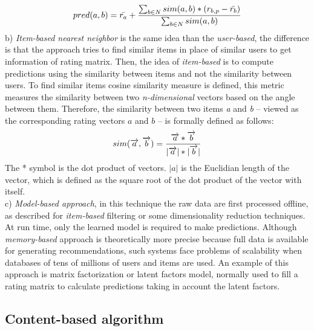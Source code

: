 \begin{equation}\label{eq:prediction}
\displaystyle pred(a,b) = \bar{r_a} + 
{\sum_{b \in N} sim(a,b) * (r_{b,p}- \bar{r_b}) 
\over \sum_{b \in N} sim(a,b)} 
\end{equation}
b) \textit{Item-based nearest neighbor} is the same idea than the \textit
{user-based}, the difference is that the approach tries to find
similar items in place of similar users to get information of rating
matrix.  Then, the idea of \textit{item-based} is to compute
predictions using the similarity between items and not the similarity
between users.  To find similar items cosine similarity measure is
defined, this metric measures the similarity between two
\textit{n-dimensional} vectors based on the angle between them.
Therefore, the similarity between two items \textit{a} and \textit{b}
– viewed as the corresponding rating vectors $a$ and $b$ – is formally
defined as follows:
\begin{equation}\label{eq:cosine}
\displaystyle sim(\overrightarrow{a},\overrightarrow{b})= 
{\overrightarrow{a}* \overrightarrow{b} \over
|\overrightarrow{a}|*|\overrightarrow{b}| }
\end{equation}
The * symbol is the dot product of vectors. $|a|$ is the Euclidian
length of the vector, which is defined as the square root of the dot
product of the vector with itself.\\ 
c) \textit{Model-based approach}, in this technique  the raw data are
first processed offline, as described for \textit {item-based}
filtering or some dimensionality reduction techniques. At run time,
only the learned model is required to make predictions. Although
\textit{memory-based} approach is theoretically more precise because
full data is available for generating recommendations, such systems
face problems of scalability when databases of tens of millions of
users and items are used. An example of this approach is matrix
factorization or latent factors model, normally used to fill a rating
matrix to calculate predictions taking in account the latent factors.

\subsection{Content-based algorithm}

